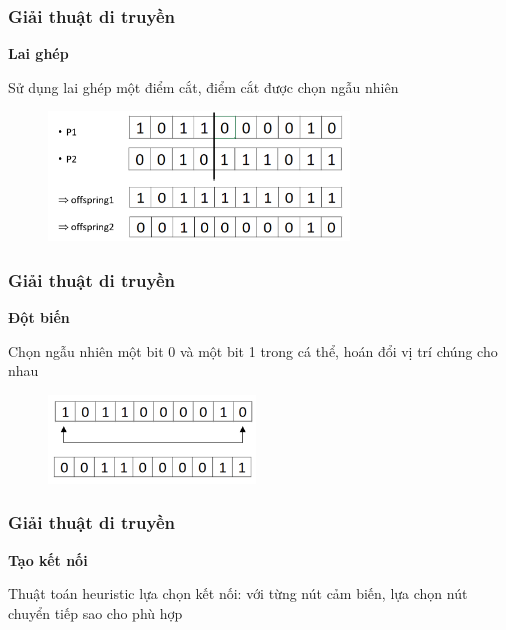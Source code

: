 \begin{frame}
    \frametitle{Giải thuật di truyền}
    
    \textbf{Lai ghép}

    Sử dụng lai ghép một điểm cắt, điểm cắt được chọn ngẫu nhiên
       
    \begin{figure}[h]
        \centering
        \includegraphics[width=8cm]{picture/crossover.png}
    \end{figure}

\end{frame}

\begin{frame}
    \frametitle{Giải thuật di truyền}
    
    \textbf{Đột biến}
    
    Chọn ngẫu nhiên một bit 0 và một bit 1 trong cá thể, hoán đổi vị trí chúng cho nhau 
       
    \begin{figure}[h]
        \centering
        \includegraphics[width=5.5cm]{picture/mutation.png}
    \end{figure}
\end{frame}

\begin{frame}
    \frametitle{Giải thuật di truyền}
    
    \textbf{Tạo kết nối}
    
    Thuật toán heuristic lựa chọn kết nối: với từng nút cảm biến, lựa chọn nút chuyển tiếp sao cho phù hợp
\end{frame}


